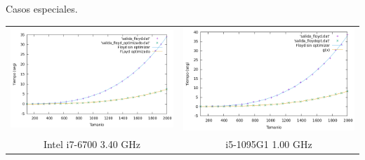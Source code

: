 \documentclass[10pt, xcolor=table]{beamer}
\begin{document}
\begin{frame}[fragile]{Casos especiales.
}
\centering
\begin{tabular}{cc}
\includegraphics[scale=0.2]{../../Images/floyd_opt_Javi5454.png}
&
\includegraphics[scale=0.2]{../../Images/floyd_opt_Jota.png}
\\
Intel i7-6700 3.40 GHz & i5-1095G1 1.00 GHz
\end{tabular}
\end{frame}
\end{document}
